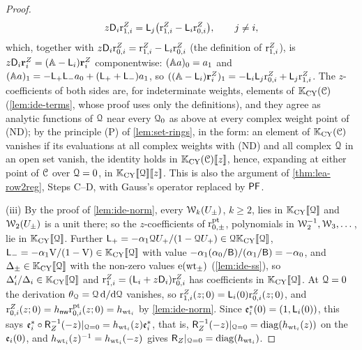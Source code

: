 \begin{proof}
\[
z\mathsf{D}_i\mathrm{r}^{Z}_{1,i}=\mathsf{L}_j\big(\mathrm{r}^{Z}_{1,i}-\mathsf{L}_i\mathrm{r}^{Z}_{0,i}\big),\qquad j\neq i,
\]
which, together with $z\mathsf{D}_i\mathrm{r}^{Z}_{0,i}=\mathrm{r}^{Z}_{1,i}-\mathsf{L}_i\mathrm{r}^{Z}_{0,i}$ (the definition of $\mathrm{r}^{Z}_{1,i}$), is $z\mathsf{D}_i\mathbf{r}^Z_i=(\mathbb{A}-\mathsf{L}_i)\mathbf{r}^Z_i$ componentwise: $(\mathbb{A} a)_0=a_1$ and $(\mathbb{A} a)_1=-\mathsf{L}_+\mathsf{L}_-a_0+(\mathsf{L}_++\mathsf{L}_-)a_1$, so $((\mathbb{A}-\mathsf{L}_i)\mathbf{r}_i^Z)_1=-\mathsf{L}_i\mathsf{L}_j\mathrm{r}^{Z}_{0,i}+\mathsf{L}_j\mathrm{r}^{Z}_{1,i}$. The $z$-coefficients of both sides are, for indeterminate weights, elements of $\mathbb{K}_{\mathrm{CY}}(\mathcal{C})$ (\cref{lem:ide-terms}, whose proof uses only the definitions), and they agree as analytic functions of $\mathcal{Q}$ near every $\mathcal{Q}_0$ as above at every complex weight point of (ND); by the principle (P) of \cref{lem:set-rings}, in the form: an element of $\mathbb{K}_{\mathrm{CY}}(\mathcal{C})$ vanishes if its evaluations at all complex weights with (ND) and all complex $\mathcal{Q}$ in an open set vanish, the identity holds in $\mathbb{K}_{\mathrm{CY}}(\mathcal{C})[\![ z ]\!]$, hence, expanding at either point of $\mathcal{C}$ over $\mathcal{Q}=0$, in $\mathbb{K}_{\mathrm{CY}}[\![ \mathcal{Q} ]\!][\![ z ]\!]$.  This is also the argument of \cref{thm:lea-row2reg}, Steps C--D, with Gauss's operator replaced by $\mathsf{PF}$.

(iii) By the proof of \cref{lem:ide-norm}, every $\mathcal{W}_k(U_\pm)$, $k\geq 2$, lies in $\mathbb{K}_{\mathrm{CY}}[\![ \mathcal{Q} ]\!]$ and $\mathcal{W}_2(U_\pm)$ is a unit there; so the $z$-coefficients of $\mathrm{r}^{\mathrm{pt}}_{0,\pm}$, polynomials in $\mathcal{W}_2^{-1},\mathcal{W}_3,\dots$, lie in $\mathbb{K}_{\mathrm{CY}}[\![ \mathcal{Q} ]\!]$. Further $\mathsf{L}_+=-\alpha_1\mathcal{Q} U_+/(1-\mathcal{Q} U_+)\in\mathcal{Q}\mathbb{K}_{\mathrm{CY}}[\![ \mathcal{Q} ]\!]$, $\mathsf{L}_-=-\alpha_1\mathrm{V}/(1-\mathrm{V})\in\mathbb{K}_{\mathrm{CY}}[\![ \mathcal{Q} ]\!]$ with value $-\alpha_1(\alpha_0/\mathsf{B})/(\alpha_1/\mathsf{B})=-\alpha_0$, and $\Delta_\pm\in\mathbb{K}_{\mathrm{CY}}[\![ \mathcal{Q} ]\!]$ with the non-zero values $\mathrm{e}(\mathrm{wt}_\pm)$ (\cref{lem:ide-ss}), so $\Delta_i'/\Delta_i\in\mathbb{K}_{\mathrm{CY}}[\![ \mathcal{Q} ]\!]$ and $\mathrm{r}^{Z}_{1,i}=(\mathsf{L}_i+z\mathsf{D}_i)\mathrm{r}^{Z}_{0,i}$ has coefficients in $\mathbb{K}_{\mathrm{CY}}[\![ \mathcal{Q} ]\!]$. At $\mathcal{Q}=0$ the derivation $\theta_{\mathcal{Q}}=\mathcal{Q}\,\mathrm{d}/\mathrm{d}\mathcal{Q}$ vanishes, so $\mathrm{r}^{Z}_{1,i}(z;0)=\mathsf{L}_i(0)\mathrm{r}^{Z}_{0,i}(z;0)$, and $\mathrm{r}^{Z}_{0,i}(z;0)=h_{\mathsf{nw}}\mathrm{r}^{\mathrm{pt}}_{0,i}(z;0)=h_{\mathrm{wt}_i}$ by \cref{lem:ide-norm}. Since $\mathfrak{e}_i^*(0)=(1,\mathsf{L}_i(0))$, this says $\mathfrak{e}_i^*\circ\mathsf{R}_{Z}^{-1}(-z)|_{\mathcal{Q}=0}=h_{\mathrm{wt}_i}(z)\mathfrak{e}_i^*$, that is, $\mathsf{R}_{Z}^{-1}(-z)|_{\mathcal{Q}=0}=\mathrm{diag}(h_{\mathrm{wt}_i}(z))$ on the $\mathfrak{e}_i(0)$, and $h_{\mathrm{wt}_i}(z)^{-1}=h_{\mathrm{wt}_i}(-z)$ gives $\mathsf{R}_{Z}|_{\mathcal{Q}=0}=\mathrm{diag}(h_{\mathrm{wt}_i})$.


\end{proof}
